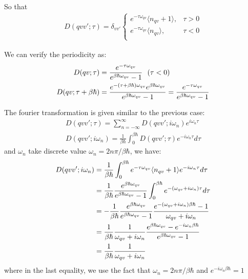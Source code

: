\documentclass{article}
\begin{document}
So that 
\begin{align}
    D(qvv';\tau) = \delta_{vv'}
    \begin{cases}
        e^{-\tau\omega_{qv}} \langle n_{qv} + 1 \rangle, &\tau > 0 \\
        e^{-\tau\omega_{qv}} \langle n_{qv} \rangle , &\tau < 0 \\
    \end{cases}
\end{align}

We can verify the periodicity as:
\begin{align}
    D(qv;\tau) &= \frac{e^{-\tau\omega_{qv}}}{e^{\beta\hbar\omega_{qv}}- 1} \ \ (\tau < 0) \notag \\
    D(qv;\tau+\beta\hbar) &= \frac{e^{-(\tau+\beta\hbar)\omega_{qv}} e^{\beta\hbar\omega_{qv}}}{e^{\beta\hbar\omega_{qv}}- 1} 
                         = \frac{e^{-\tau\omega_{qv}}}{e^{\beta\hbar\omega_{qv}}- 1} \notag
\end{align}

The fourier transformation is given similar to the previous case:
\begin{gather}
        D(qvv';\tau) = \sum_{n = - \infty}^{\infty} D(qvv';i\omega_n) e^{i\omega_n\tau} \\
        D(qvv';i\omega_n) = \frac{1}{\beta\hbar} \int_{0}^{\beta\hbar} D(qvv';\tau) e^{-i\omega_n\tau} d\tau
\end{gather}
and $\omega_n$ take discrete value $\omega_n = 2n\pi/\beta\hbar$, we have:
\begin{align}
    D(qvv';i\omega_n) &= \frac{1}{\beta\hbar} \int_{0}^{\beta\hbar} e^{-\tau\omega_{qv}} \langle n_{qv} + 1 \rangle e^{-i\omega_n\tau} d\tau \notag \\
                    &= \frac{1}{\beta\hbar} \frac{e^{\beta\hbar\omega_{qv}}}{e^{\beta\hbar\omega_{qv}}- 1} \int_0^{\beta\hbar} e^{-(\omega_{qv} + i\omega_n)\tau} d\tau \notag \\
                    &= - \frac{1}{\beta\hbar} \frac{e^{\beta\hbar\omega_{qv}}}{e^{\beta\hbar\omega_{qv}}- 1} \frac{e^{-(\omega_{qv} + i\omega_n)\beta\hbar} - 1}{\omega_{qv} + i\omega_n} \notag \\
                    &= \frac{1}{\beta\hbar} \frac{1}{\omega_{qv} + i\omega_n}\frac{e^{\beta\hbar\omega_{qv}}- e^{-i\omega_n \beta\hbar}}{e^{\beta\hbar\omega_{qv}}- 1}  \notag \\
                    &= \frac{1}{\beta\hbar} \frac{1}{\omega_{qv} + i\omega_n}
\end{align}
where in the last equality, we use the fact that $\omega_n = 2n\pi/\beta\hbar$ and $e^{-i\omega_n \beta\hbar} = 1$
\end{document}
